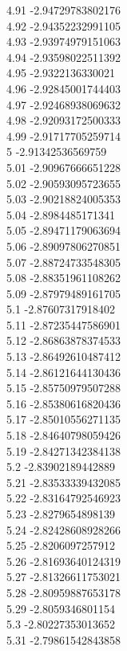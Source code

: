 {4.91	-2.94729783802176\\
4.92	-2.94352232991105\\
4.93	-2.93974979151063\\
4.94	-2.93598022511392\\
4.95	-2.9322136330021\\
4.96	-2.92845001744403\\
4.97	-2.92468938069632\\
4.98	-2.92093172500333\\
4.99	-2.91717705259714\\
5	-2.91342536569759\\
5.01	-2.90967666651228\\
5.02	-2.90593095723655\\
5.03	-2.90218824005353\\
5.04	-2.8984485171341\\
5.05	-2.89471179063694\\
5.06	-2.89097806270851\\
5.07	-2.88724733548305\\
5.08	-2.88351961108262\\
5.09	-2.87979489161705\\
5.1	-2.87607317918402\\
5.11	-2.87235447586901\\
5.12	-2.86863878374533\\
5.13	-2.86492610487412\\
5.14	-2.86121644130436\\
5.15	-2.85750979507288\\
5.16	-2.85380616820436\\
5.17	-2.85010556271135\\
5.18	-2.84640798059426\\
5.19	-2.84271342384138\\
5.2	-2.83902189442889\\
5.21	-2.83533339432085\\
5.22	-2.83164792546923\\
5.23	-2.8279654898139\\
5.24	-2.82428608928266\\
5.25	-2.8206097257912\\
5.26	-2.81693640124319\\
5.27	-2.81326611753021\\
5.28	-2.80959887653178\\
5.29	-2.8059346801154\\
5.3	-2.80227353013652\\
5.31	-2.79861542843858\\
}
